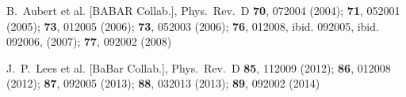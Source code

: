 \documentclass[epj,onecolumn]{webofc}
\begin{document}
\begin{thebibliography}{}
B.~Aubert et al. [BABAR Collab.],
Phys.\ Rev.\ D {\bf 70}, 072004 (2004);
{\bf 71}, 052001 (2005);
{\bf 73}, 012005 (2006);
{\bf 73}, 052003 (2006);
{\bf 76}, 012008, ibid. 092005, ibid. 092006, (2007);
{\bf 77}, 092002 (2008)


  J.~P.~Lees et al. [BaBar Collab.],
  Phys.\ Rev.\ D {\bf 85}, 112009 (2012);
%
{\bf 86}, 012008 (2012);
%
{\bf 87}, 092005 (2013);
%
{\bf 88}, 032013 (2013);
%
{\bf 89}, 092002 (2014)


\end{thebibliography}
\end{document}

